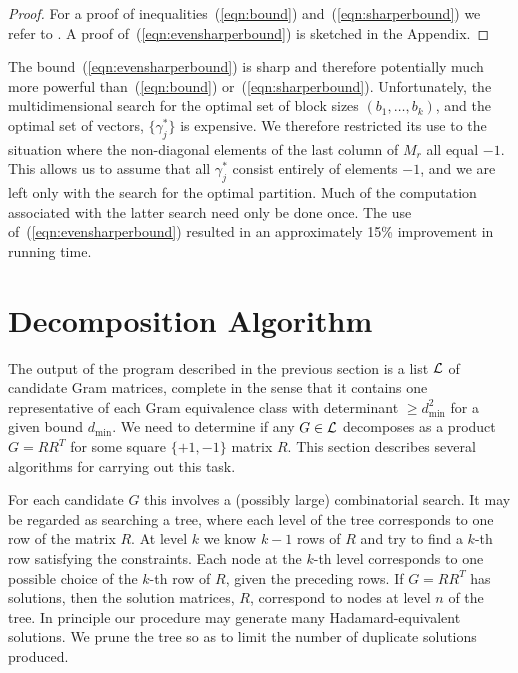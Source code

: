\documentclass[11pt,a4paper]{article}
\begin{document}
\begin{proof}
For a proof of inequalities~(\ref{eqn:bound}) and~(\ref{eqn:sharperbound})
we refer to \cite[Theorem 3.1 and Corollary 3.3]{Orrick05}.  A proof
of~(\ref{eqn:evensharperbound}) is sketched in the Appendix.
\end{proof}

The bound~(\ref{eqn:evensharperbound}) is sharp and therefore potentially
much more powerful than~(\ref{eqn:bound}) or~(\ref{eqn:sharperbound}). 
Unfortunately, the multidimensional search for the optimal set of block
sizes $(b_1,\ldots,b_k)$, and the optimal set of vectors, $\{\gamma_j^*\}$
is expensive.  We therefore restricted its use to the situation where the
non-diagonal elements of the last column of $M_r$ all equal $-1$.  This
allows us to assume that all $\gamma_j^*$ consist entirely of elements $-1$,
and we are left only with the search for the optimal partition.  Much of the
computation associated with the latter search need only be done once.  The
use of~(\ref{eqn:evensharperbound}) resulted in an approximately 15\%
improvement in running time.

\newpage

\section{Decomposition Algorithm}	\label{sec:decomp}

The output of the program described in the previous section is a list $\cal L$ of candidate Gram matrices, complete in the sense that it contains one representative of each
Gram equivalence class with determinant $\ge d_{\min}^2$ 
for a given bound $d_{\min}$.  We
need to determine if any $G \in \cal L$ decomposes as a product
$G = RR^T$ for some square $\{+1,-1\}$ matrix $R$.   This section describes several algorithms for carrying out this task.

For each candidate $G$ this
involves a (possibly large) combinatorial search. It may be regarded as
searching a tree, where each level of the tree corresponds to one row
of the matrix $R$.  At level $k$ we know $k-1$ rows of $R$ and try to find a
$k$-th row satisfying the constraints.  Each node at the $k$-th level
corresponds to one possible choice of the $k$-th row of $R$, given the
preceding rows.   If $G=RR^T$ has solutions, then the solution matrices,
$R$, correspond to nodes at level $n$ of the tree.  In principle our
procedure may generate many Hadamard-equivalent solutions.  We
prune the tree so as to limit the number of duplicate solutions produced.
\end{document}
